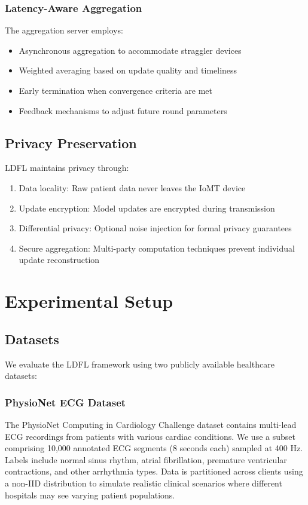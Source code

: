 \documentclass[10pt,conference]{IEEEtran}
\begin{document}
\subsubsection{Latency-Aware Aggregation}
The aggregation server employs:
\begin{itemize}
    \item Asynchronous aggregation to accommodate straggler devices
    \item Weighted averaging based on update quality and timeliness
    \item Early termination when convergence criteria are met
    \item Feedback mechanisms to adjust future round parameters
\end{itemize}

\subsection{Privacy Preservation}
LDFL maintains privacy through:
\begin{enumerate}
    \item Data locality: Raw patient data never leaves the IoMT device
    \item Update encryption: Model updates are encrypted during transmission
    \item Differential privacy: Optional noise injection for formal privacy guarantees
    \item Secure aggregation: Multi-party computation techniques prevent individual update reconstruction
\end{enumerate}

\section{Experimental Setup}
\label{sec:experiments}

\subsection{Datasets}
We evaluate the LDFL framework using two publicly available healthcare datasets:

\subsubsection{PhysioNet ECG Dataset}
The PhysioNet Computing in Cardiology Challenge dataset contains multi-lead ECG recordings from patients with various cardiac conditions. We use a subset comprising 10,000 annotated ECG segments (8 seconds each) sampled at 400 Hz. Labels include normal sinus rhythm, atrial fibrillation, premature ventricular contractions, and other arrhythmia types. Data is partitioned across clients using a non-IID distribution to simulate realistic clinical scenarios where different hospitals may see varying patient populations.
\end{document}
